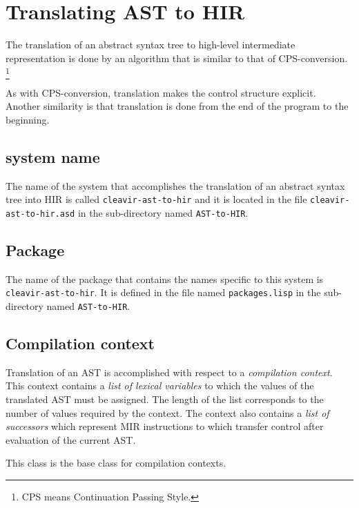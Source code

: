 \chapter{Translating AST to HIR}
\label{chap-translating-ast-to-hir}

The translation of an abstract syntax tree
 to high-level intermediate
representation  is done by an algorithm that is
similar to that of CPS-conversion.%
\footnote{CPS means Continuation Passing Style.}

As with CPS-conversion, translation makes the control structure
explicit.  Another similarity is that translation is done from the end
of the program to the beginning.

\section{\asdf{} system name}

The name of the \asdf{} system that accomplishes the translation of an
abstract syntax tree into HIR is called \texttt{cleavir-ast-to-hir}
and it is located in the file \texttt{cleavir-ast-to-hir.asd} in the
sub-directory named \texttt{AST-to-HIR}.

\section{Package}

The name of the package that contains the names specific to this
system is \texttt{cleavir-ast-to-hir}.  It is defined in the file
named \texttt{packages.lisp} in the sub-directory named
\texttt{AST-to-HIR}.

\section{Compilation context}

Translation of an AST is accomplished with respect to a
\emph{compilation context}.  This context contains a \emph{list of
  lexical variables} to which the values of the translated AST must be
assigned.  The length of the list corresponds to the number of values
required by the context.  The context also contains a \emph{list of
  successors} which represent MIR instructions to which transfer
control after evaluation of the current AST.


This class is the base class for compilation contexts.







